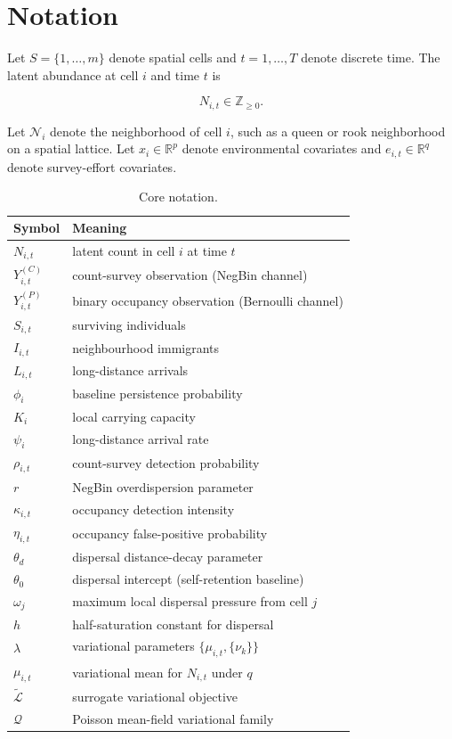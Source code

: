 \documentclass[review,12pt]{elsarticle}
\theoremstyle{definition}
\begin{document}
\section{Notation}

Let \(S=\{1,\ldots,m\}\) denote spatial cells and \(t=1,\ldots,T\) denote discrete time.
The latent abundance at cell \(i\) and time \(t\) is

\[
N_{i,t}\in\mathbb{Z}_{\ge 0}.
\]

Let \(\mathcal{N}_i\) denote the neighborhood of cell \(i\), such as a queen or rook
neighborhood on a spatial lattice. Let \(x_i\in\mathbb{R}^p\) denote environmental
covariates and \(e_{i,t}\in\mathbb{R}^q\) denote survey-effort covariates.

\begin{table}[h!]
\centering
\caption{Core notation.}
\begin{tabular}{ll}
\toprule
Symbol & Meaning \\
\midrule
\(N_{i,t}\) & latent count in cell \(i\) at time \(t\) \\
\(Y^{(C)}_{i,t}\) & count-survey observation (NegBin channel) \\
\(Y^{(P)}_{i,t}\) & binary occupancy observation (Bernoulli channel) \\
\(S_{i,t}\) & surviving individuals \\
\(I_{i,t}\) & neighbourhood immigrants \\
\(L_{i,t}\) & long-distance arrivals \\
\(\phi_i\) & baseline persistence probability \\
\(K_i\) & local carrying capacity \\
\(\psi_i\) & long-distance arrival rate \\
\(\rho_{i,t}\) & count-survey detection probability \\
\(r\) & NegBin overdispersion parameter \\
\(\kappa_{i,t}\) & occupancy detection intensity \\
\(\eta_{i,t}\) & occupancy false-positive probability \\
\(\theta_d\) & dispersal distance-decay parameter \\
\(\theta_0\) & dispersal intercept (self-retention baseline) \\
\(\omega_j\) & maximum local dispersal pressure from cell $j$ \\
\(h\) & half-saturation constant for dispersal \\
\(\lambda\) & variational parameters $\{\mu_{i,t},\{\nu_k\}\}$ \\
\(\mu_{i,t}\) & variational mean for $N_{i,t}$ under $q$ \\
\(\tilde{\mathcal{L}}\) & surrogate variational objective \\
\(\mathcal{Q}\) & Poisson mean-field variational family \\
\bottomrule
\end{tabular}
\end{table}
\end{document}
